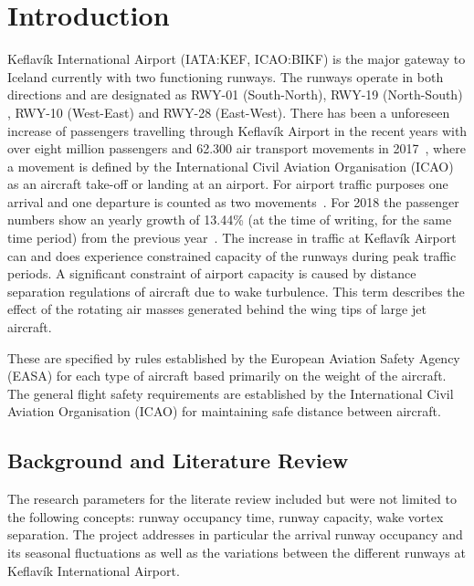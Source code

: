 \chapter{Introduction\label{cha:introduction}}

Keflavík International Airport (IATA:KEF, ICAO:BIKF) is the major gateway to Iceland currently with two functioning runways. The runways operate in both directions and are designated as RWY-01 (South-North), RWY-19 (North-South) , RWY-10 (West-East) and RWY-28 (East-West). 
There has been a unforeseen increase of passengers travelling through Keflavík Airport in the recent years with over eight million passengers and 62.300 air transport movements in 2017~\cite{isavia_facts_2017}, where a movement is defined by the International Civil Aviation Organisation (ICAO) as an aircraft take-off or landing at an airport. For airport traffic purposes one arrival and one departure is counted as two movements~\cite{aircraft_movement}. For 2018 the passenger numbers show an yearly growth of 13.44\% (at the time of writing, for the same time period) from the previous year~\cite{isavia_pass_statistics_2018}. The increase in traffic at Keflavík Airport can and does experience constrained capacity of the runways during peak traffic periods. 
A significant constraint of airport capacity is caused by distance separation regulations of aircraft due to wake turbulence. This term describes the effect of the rotating air masses generated behind the wing tips of large jet aircraft. 

These are specified by rules established by the European Aviation Safety Agency (EASA) for each type of aircraft based primarily on the weight of the aircraft. The general flight safety requirements are established by the International Civil Aviation Organisation (ICAO) for maintaining safe distance between aircraft.

\section{Background and Literature Review}
The research parameters for the literate review included but were not limited to the following concepts: runway occupancy time, runway capacity, wake vortex separation. The project addresses in particular the arrival runway occupancy and its seasonal fluctuations as well as the variations between the different runways at Keflavík International Airport.

